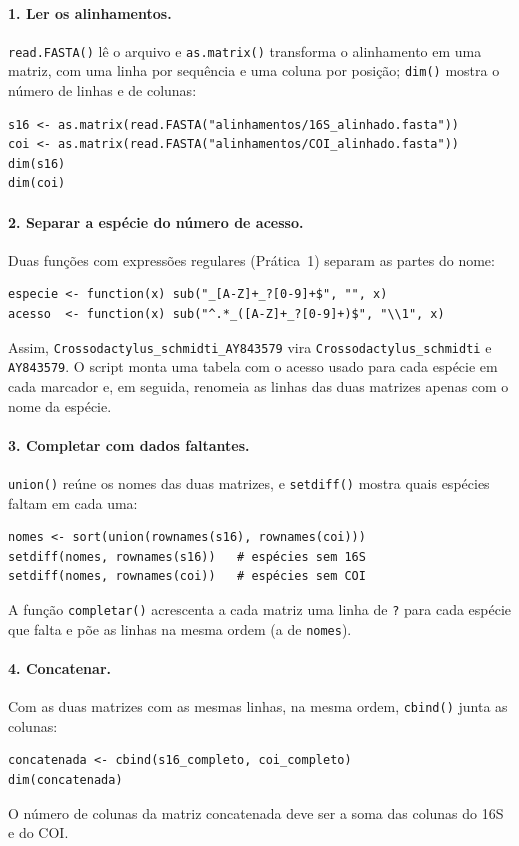 \documentclass[11pt,a4paper]{article}
\begin{document}
\paragraph{1. Ler os alinhamentos.} \verb|read.FASTA()| lê o arquivo e \verb|as.matrix()|
transforma o alinhamento em uma matriz, com uma linha por sequência e uma coluna por posição;
\verb|dim()| mostra o número de linhas e de colunas:
\begin{Verbatim}
s16 <- as.matrix(read.FASTA("alinhamentos/16S_alinhado.fasta"))
coi <- as.matrix(read.FASTA("alinhamentos/COI_alinhado.fasta"))
dim(s16)
dim(coi)
\end{Verbatim}

\paragraph{2. Separar a espécie do número de acesso.} Duas funções com expressões regulares
(Prática~1) separam as partes do nome:
\begin{Verbatim}
especie <- function(x) sub("_[A-Z]+_?[0-9]+$", "", x)
acesso  <- function(x) sub("^.*_([A-Z]+_?[0-9]+)$", "\\1", x)
\end{Verbatim}
Assim, \verb|Crossodactylus_schmidti_AY843579| vira \verb|Crossodactylus_schmidti| e
\verb|AY843579|. O script monta uma tabela com o acesso usado para cada espécie em cada
marcador e, em seguida, renomeia as linhas das duas matrizes apenas com o nome da espécie.

\paragraph{3. Completar com dados faltantes.} \verb|union()| reúne os nomes das duas
matrizes, e \verb|setdiff()| mostra quais espécies faltam em cada uma:
\begin{Verbatim}
nomes <- sort(union(rownames(s16), rownames(coi)))
setdiff(nomes, rownames(s16))   # espécies sem 16S
setdiff(nomes, rownames(coi))   # espécies sem COI
\end{Verbatim}
A função \verb|completar()| acrescenta a cada matriz uma linha de \verb|?| para cada espécie
que falta e põe as linhas na mesma ordem (a de \verb|nomes|).

\paragraph{4. Concatenar.} Com as duas matrizes com as mesmas linhas, na mesma ordem,
\verb|cbind()| junta as colunas:
\begin{Verbatim}
concatenada <- cbind(s16_completo, coi_completo)
dim(concatenada)
\end{Verbatim}
O número de colunas da matriz concatenada deve ser a soma das colunas do 16S e do COI.
\end{document}
